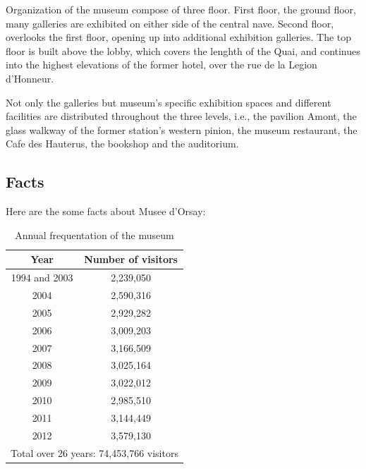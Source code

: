 \documentclass[
10pt, %
a4paper, %
oneside, %
headinclude,footinclude, %
BCOR5mm, %
]{scrartcl}
\theoremstyle{definition} %
\theoremstyle{plain} %
\theoremstyle{remark} %
\begin{document}
Organization of the museum compose of three floor. First floor, the ground floor, many galleries are exhibited on either side of the central nave. Second floor, overlooks the first floor, opening up into additional exhibition galleries. The top floor is built above the lobby, which covers the lenghth of the Quai, and continues into the highest elevations of the former hotel, over the rue de la Legion d'Honneur. 

Not only the galleries but museum's specific exhibition spaces and different facilities are distributed throughout the three levels, i.e., the pavilion Amont, the glass walkway of the former station's western pinion, the museum restaurant, the Cafe des Hauterus, the bookshop and the auditorium.

\subsection{Facts}

Here are the some facts about Musee d'Orsay:\cite{orsayMuseumHistory}

\begin{table}[h]
\centering
\begin{tabular}{|c|c|l|l|l|}
\hline
\textbf{Year} & \multicolumn{4}{c|}{\textbf{Number of visitors}} \\ \hline
1994 and 2003 & \multicolumn{4}{c|}{2,239,050} \\ \hline
2004 & \multicolumn{4}{c|}{2,590,316} \\ \hline
2005 & \multicolumn{4}{c|}{2,929,282} \\ \hline
2006 & \multicolumn{4}{c|}{3,009,203} \\ \hline
2007 & \multicolumn{4}{c|}{3,166,509} \\ \hline
2008 & \multicolumn{4}{c|}{3,025,164} \\ \hline
2009 & \multicolumn{4}{c|}{3,022,012} \\ \hline
2010 & \multicolumn{4}{c|}{2,985,510} \\ \hline
2011 & \multicolumn{4}{c|}{3,144,449} \\ \hline
2012 & \multicolumn{4}{c|}{3,579,130} \\ \hline
\multicolumn{5}{|c|}{Total over 26 years: 74,453,766 visitors} \\ \hline
\end{tabular}
\caption{Annual frequentation of the museum}
\label{tab:numberVisitor}
\end{table}
\end{document}
